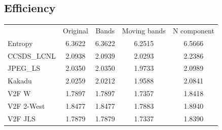 \documentclass{article}
\begin{document}
\subsection*{Efficiency}
\begin{table}[h]
\begin{tabular}{lcccc}
\rowcolor[HTML]{C0C0C0} 
 & Original & Bands & Moving bands & N component \\
\cellcolor[HTML]{C0C0C0}Entropy & \cellcolor[HTML]{E0E0E0}6.3622 &  \cellcolor[HTML]{E0E0E0}6.3622 &  \cellcolor[HTML]{E0E0E0}6.2515 &  \cellcolor[HTML]{E0E0E0} 6.5666\\ 
\cellcolor[HTML]{C0C0C0}CCSDS\_LCNL & 2.0938 & 2.0939 & 2.0293 & \cellcolor[HTML]{DAE8FC} 2.2386\\
\cellcolor[HTML]{C0C0C0}JPEG\_LS    & 2.0350 & 2.0350 & 1.9733 & \cellcolor[HTML]{DAE8FC} 2.0989\\
\cellcolor[HTML]{C0C0C0}Kakadu      & 2.0259 & 2.0212 & 1.9588 & \cellcolor[HTML]{DAE8FC} 2.0841\\
\cellcolor[HTML]{C0C0C0}V2F W       & 1.7897 & 1.7897 & 1.7357 & \cellcolor[HTML]{DAE8FC} 1.8418\\
\cellcolor[HTML]{C0C0C0}V2F 2-West  & 1.8477 & 1.8477 & 1.7883 & \cellcolor[HTML]{DAE8FC} 1.8940\\
\cellcolor[HTML]{C0C0C0}V2F JLS     & 1.7879 & 1.7879 & 1.7337 & \cellcolor[HTML]{DAE8FC} 1.8390\\
\end{tabular}
\end{table}
\end{document}

